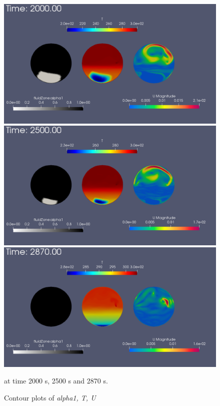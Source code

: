 \documentclass{article}
\begin{document}
    \begin{figure}[ht]
        \centering
        
        \includegraphics[width=0.75\linewidth]{time2000.png}
        \includegraphics[width=0.75\linewidth]{time2500.png}
        \includegraphics[width=0.75\linewidth]{time2870.png}
        \caption{Contour plots of \textsl{alpha1, T, U}} at time 2000 s, 2500 s and 2870 s. 
        \label{fig:resFinal}
    \end{figure}
    \clearpage
    \printbibliography
\end{document}
